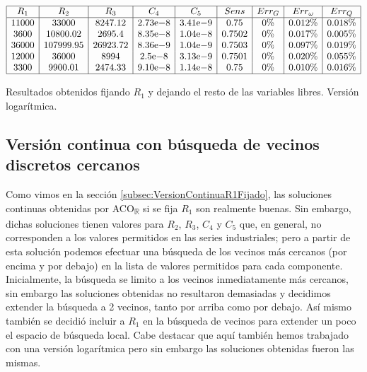 \documentclass{llncs}
\newcommand{\expnumber}[2]{{#1}\mathrm{e}{#2}}
\begin{document}
	\begin{table}[!h]
		$$
		\begin{array}{|c|c|c|c|c|c|c|c|c|c|}
		\hline
		R_1 & R_2 & R_3 & C_4 & C_5 & Sens & Err_G & Err_\omega & Err_Q \\
		\hline
		11000 & 33000 & 8247.12 & \expnumber{2.73}{-8} & \expnumber{3.41}{-9} & 0.75 & 0\% & 0.012\% & 0.018\% \\
		3600 & 10800.02 & 2695.4 & \expnumber{8.35}{-8} & \expnumber{1.04}{-8} & 0.7502 & 0\% & 0.017\% & 0.005\% \\
		36000 & 107999.95 & 26923.72 & \expnumber{8.36}{-9} & \expnumber{1.04}{-9} & 0.7503 & 0\% & 0.097\% & 0.019\% \\
		12000 & 36000 & 8994 & \expnumber{2.5}{-8} & \expnumber{3.13}{-9} & 0.7501 & 0\% & 0.020\% & 0.055\% \\
		3300 & 9900.01 & 2474.33 & \expnumber{9.10}{-8} & \expnumber{1.14}{-8} & 0.75 & 0\% & 0.010\% & 0.016\% \\
		\hline
		\end{array}
		$$
		\caption{Resultados obtenidos fijando $R_1$ y dejando el resto de las variables libres. Versión logarítmica.}
		\label{cuadroSolsLog}
	\end{table}
	
	\subsection{Versión continua con búsqueda de vecinos discretos cercanos}
	\label{subsec:VersionDiscreta}
	Como vimos en la sección \ref{subsec:VersionContinuaR1Fijado}, las soluciones continuas obtenidas por ACO\textsubscript{$\mathbb{R}$} 
	si se fija $R_1$ son realmente buenas. Sin embargo, dichas soluciones  tienen valores para $R_2$, $R_3$, $C_4$ y $C_5$ que, 
	en general, no corresponden a los valores permitidos en las series industriales; pero a partir de esta solución podemos efectuar 
	una búsqueda de los vecinos más cercanos (por encima y por debajo) en la lista de valores permitidos para cada 
	componente. Inicialmente, la búsqueda se limito a los vecinos inmediatamente más cercanos, sin embargo las soluciones obtenidas
	no resultaron demasiadas y decidimos extender la búsqueda a 2 vecinos, tanto por arriba como por debajo. Así mismo también
	se decidió incluir a $R_1$ en la búsqueda de vecinos para extender un poco el espacio de búsqueda local. Cabe destacar que aquí
	también hemos trabajado con una versión logarítmica pero sin embargo las soluciones obtenidas fueron las mismas.
	
\end{document}
